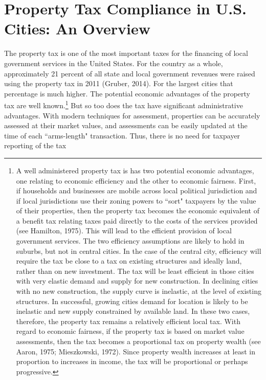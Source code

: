 \documentclass[12pt,titlepage]{article}
\begin{document}
\section{Property Tax Compliance in U.S. Cities: An Overview}


The property tax is one of the most important taxes for the financing
of local government services in the United States.  For the country as
a whole, approximately 21 percent of all state and local government
revenues were raised using the property tax in 2011 (Gruber, 2014).
For the largest cities that percentage is much higher.  The potential
economic advantages of the property tax are well known.\footnote{A
  well administered property tax is has two potential economic
  advantages, one relating to economic efficiency and the other to
  economic fairness.  First, if households and businesses are mobile
  across local political jurisdiction and if local jurisdictions use
  their zoning powers to ``sort" taxpayers by the value of their
  properties, then the property tax becomes the economic equivalent of
  a benefit tax relating taxes paid directly to the costs of the
  services provided (see Hamilton, 1975).  This will lead to the
  efficient provision of local government services.  The two
  efficiency assumptions are likely to hold in suburbs, but not in
  central cities.  In the case of the central city, efficiency will
  require the tax be close to a tax on existing structures and ideally
  land, rather than on new investment.  The tax will be least
  efficient in those cities with very elastic demand and supply for
  new construction.  In declining cities with no new construction, the
  supply curve is inelastic, at the level of existing structures.  In
  successful, growing cities demand for location is likely to be
  inelastic and new supply constrained by available land.  In these
  two cases, therefore, the property tax remains a relatively
  efficient local tax.  With regard to economic fairness, if the
  property tax is based on market value assessments, then the tax
  becomes a proportional tax on property wealth (see Aaron, 1975;
  Mieszkowski, 1972).  Since property wealth increases at least in
  proportion to increases in income, the tax will be proportional or
  perhaps progressive.}  But so too does the tax have significant
administrative advantages.  With modern techniques for assessment,
properties can be accurately assessed at their market values, and
assessments can be easily updated at the time of each ``arms-length"
transaction.  Thus, there is no need for taxpayer reporting of the tax
\end{document}
